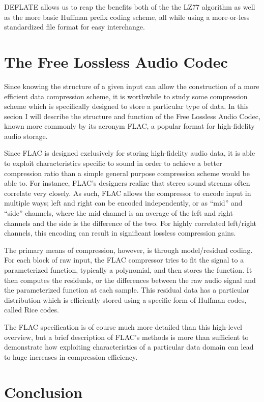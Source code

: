 \documentclass[12pt]{article}
\begin{document}
DEFLATE allows us to reap the benefits both of the the LZ77 algorithm
as well as the more basic Huffman prefix coding scheme, all while
using a more-or-less standardized file format for easy interchange.

\section{The Free Lossless Audio Codec}

Since knowing the structure of a given input can allow the
construction of a more efficient data compression scheme, it is
worthwhile to study some compression scheme which is specifically
designed to store a particular type of data. In this secion I will
describe the structure and function of the Free Lossless Audio Codec,
known more commonly by its acronym FLAC, a popular format for
high-fidelity audio storage. \cite{flac}

Since FLAC is designed exclusively for storing high-fidelity audio
data, it is able to exploit characteristics specific to sound in order
to achieve a better compression ratio than a simple general purpose
compression scheme would be able to. For instance, FLAC's designers
realize that stereo sound streams often correlate very closely. As
such, FLAC allows the compressor to encode input in multiple ways;
left and right can be encoded independently, or as ``mid'' and
``side'' channels, where the mid channel is an average of the left and
right channels and the side is the difference of the two. For highly
correlated left/right channels, this encoding can result in
significant lossless compression gains.

The primary means of compression, however, is through model/residual
coding. For each block of raw input, the FLAC compressor tries to fit
the signal to a parameterized function, typically a polynomial, and
then stores the function. It then computes the residuals, or the
differences between the raw audio signal and the parameterized
function at each sample. This residual data has a particular
distribution which is efficiently stored using a specific form of
Huffman codes, called Rice codes. \cite{flac}

The FLAC specification is of course much more detailed than this
high-level overview, but a brief description of FLAC's methods is more
than sufficient to demonstrate how exploiting characteristics of a
particular data domain can lead to huge increases in compression
efficiency.

\section{Conclusion}
\end{document}
